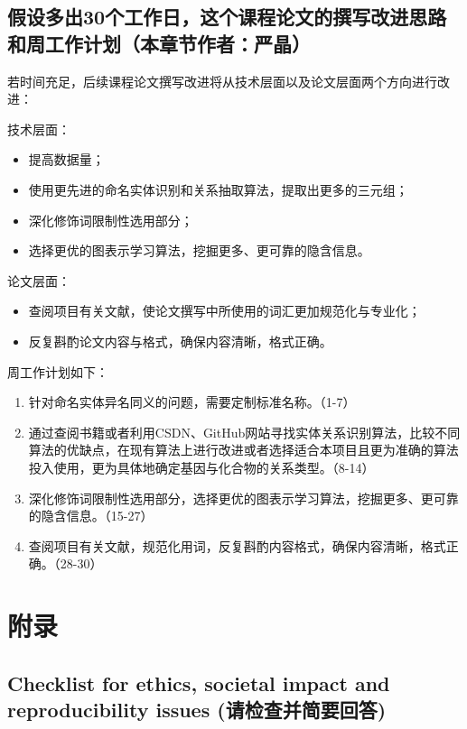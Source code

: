 \documentclass[twocolumn]{article}
\begin{document}
\subsection{假设多出30个工作日，这个课程论文的撰写改进思路和周工作计划（本章节作者：严晶）}
若时间充足，后续课程论文撰写改进将从技术层面以及论文层面两个方向进行改进：\par
技术层面：
\begin{itemize}
	\item 提高数据量；
	\item 使用更先进的命名实体识别和关系抽取算法，提取出更多的三元组；
	\item 深化修饰词限制性选用部分；
	\item 选择更优的图表示学习算法，挖掘更多、更可靠的隐含信息。
\end{itemize}\par
论文层面：
\begin{itemize}
	\item 查阅项目有关文献，使论文撰写中所使用的词汇更加规范化与专业化；
	\item 反复斟酌论文内容与格式，确保内容清晰，格式正确。
\end{itemize}\par
周工作计划如下：\par
\begin{enumerate}
	\item 针对命名实体异名同义的问题，需要定制标准名称。（1-7）
	\item 通过查阅书籍或者利用CSDN、GitHub网站寻找实体关系识别算法，比较不同算法的优缺点，在现有算法上进行改进或者选择适合本项目且更为准确的算法投入使用，更为具体地确定基因与化合物的关系类型。（8-14）
	\item 深化修饰词限制性选用部分，选择更优的图表示学习算法，挖掘更多、更可靠的隐含信息。（15-27）
	\item 查阅项目有关文献，规范化用词，反复斟酌内容格式，确保内容清晰，格式正确。（28-30）
\end{enumerate}





\section{附录\label{chap:supp}}

\subsection{Checklist for ethics, societal impact and reproducibility issues (请检查并简要回答)}
\end{document}
